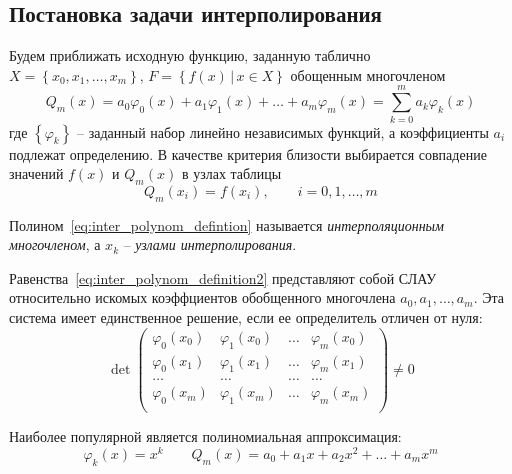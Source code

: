 \documentclass[../../calc-math-exam-2023.tex]{subfiles}
\begin{document}
    \subsection{Постановка задачи интерполирования}
    Будем приближать исходную функцию, заданную таблично $\displaystyle X = \left\{x_0, x_1,\dots,x_m\right\},\,F = \left\{f(x)\,|\, x \in X\right\}$
    обощенным многочленом
    \begin{equation}
        Q_m(x) = a_0 \varphi_0(x) + a_1 \varphi_1(x) + \dots + a_m \varphi_m(x) = \sum_{k=0}^m a_k\varphi_k(x)\label{eq:inter_polynom_defintion}
    \end{equation}
    где $\left\{ \varphi_k \right\}$ -- заданный набор линейно независимых функций, а
    коэффициенты $a_i$ подлежат определению. В качестве критерия близости выбирается
    совпадение значений $f(x)$ и $Q_m(x)$ в узлах таблицы
    \begin{equation}
        Q_m(x_i) = f(x_i), \qquad i = 0,1,\dots,m\label{eq:inter_polynom_definition2}
    \end{equation}
    \begin{definition}
        Полином~\eqref{eq:inter_polynom_defintion} называется \emph{интерполяционным многочленом},
        а $x_k$ -- \emph{узлами интерполирования}.
    \end{definition}

    Равенства~\eqref{eq:inter_polynom_definition2} представляют собой СЛАУ относительно
    искомых коэффциентов обобщенного многочлена $a_0, a_1, \dots, a_m$. Эта система
    имеет единственное решение, если ее определитель отличен от нуля:
    \begin{equation*}
        \det
        \begin{pmatrix}
            \varphi_0(x_0) & \varphi_1(x_0) & \dots & \varphi_m(x_0) \\
            \varphi_0(x_1) & \varphi_1(x_1) & \dots & \varphi_m(x_1) \\
            \dots          & \dots          & \dots & \dots          \\
            \varphi_0(x_m) & \varphi_1(x_m) & \dots & \varphi_m(x_m) \\
        \end{pmatrix}
        \neq 0
    \end{equation*}

    Наиболее популярной является полиномиальная аппроксимация:
    \begin{equation*}
        \varphi_k(x) = x^k \qquad Q_m(x) = a_0 + a_1 x + a_2 x^2 + \dots + a_m x^m
    \end{equation*}
\end{document}
